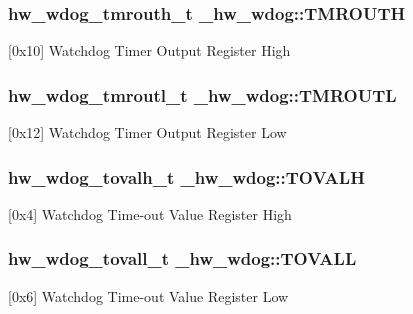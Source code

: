 \subsubsection[{\texorpdfstring{T\+M\+R\+O\+U\+TH}{TMROUTH}}]{ {\bf hw\+\_\+wdog\+\_\+tmrouth\+\_\+t} \+\_\+hw\+\_\+wdog\+::\+T\+M\+R\+O\+U\+TH}\hypertarget{struct__hw__wdog_a28d9f9c7d68b307232aeb01899d2093c}{}\label{struct__hw__wdog_a28d9f9c7d68b307232aeb01899d2093c}
\mbox{[}0x10\mbox{]} Watchdog Timer Output Register High 
\subsubsection[{\texorpdfstring{T\+M\+R\+O\+U\+TL}{TMROUTL}}]{ {\bf hw\+\_\+wdog\+\_\+tmroutl\+\_\+t} \+\_\+hw\+\_\+wdog\+::\+T\+M\+R\+O\+U\+TL}\hypertarget{struct__hw__wdog_a3eb9a15868d422dc23a330b4243c02ea}{}\label{struct__hw__wdog_a3eb9a15868d422dc23a330b4243c02ea}
\mbox{[}0x12\mbox{]} Watchdog Timer Output Register Low 
\subsubsection[{\texorpdfstring{T\+O\+V\+A\+LH}{TOVALH}}]{ {\bf hw\+\_\+wdog\+\_\+tovalh\+\_\+t} \+\_\+hw\+\_\+wdog\+::\+T\+O\+V\+A\+LH}\hypertarget{struct__hw__wdog_ad7f93dcad1df2a295661daad2f6b53c1}{}\label{struct__hw__wdog_ad7f93dcad1df2a295661daad2f6b53c1}
\mbox{[}0x4\mbox{]} Watchdog Time-\/out Value Register High 
\subsubsection[{\texorpdfstring{T\+O\+V\+A\+LL}{TOVALL}}]{ {\bf hw\+\_\+wdog\+\_\+tovall\+\_\+t} \+\_\+hw\+\_\+wdog\+::\+T\+O\+V\+A\+LL}\hypertarget{struct__hw__wdog_ae081dcd5823703c8c58c80f7dcd4781a}{}\label{struct__hw__wdog_ae081dcd5823703c8c58c80f7dcd4781a}
\mbox{[}0x6\mbox{]} Watchdog Time-\/out Value Register Low 
